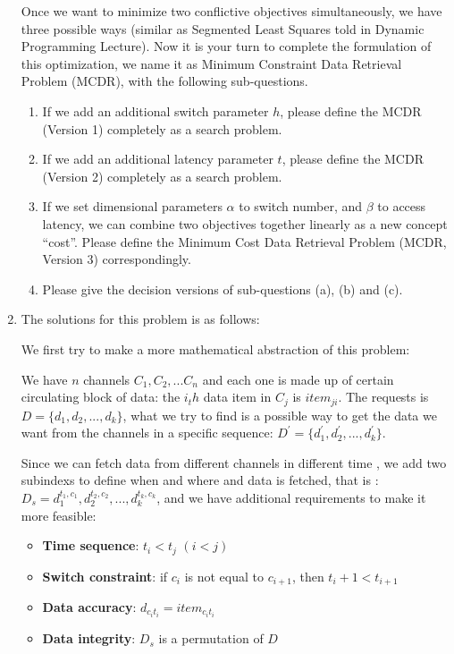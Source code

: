 \documentclass[12pt,a4paper]{article}
\makeatletter
\newtheorem*{solution}{Solution}
\theoremstyle{definition}
\renewenvironment{solution}[1][Solution] {\par\pushQED{\qed}\normalfont\topsep6\p@\@plus6\p@\relax\trivlist\item[\hskip\labelsep\bfseries#1\@addpunct{.}]\ignorespaces}{\popQED\endtrivlist\@endpefalse} \makeatother
\makeatother
\begin{document}
\begin{enumerate}
Once we want to minimize two conflictive objectives simultaneously, we have three possible ways (similar as Segmented Least Squares told in Dynamic Programming Lecture). Now it is your turn to complete the formulation of this optimization, we name it as Minimum Constraint Data Retrieval Problem (MCDR), with the following sub-questions.
\begin{enumerate}
	\item If we add an additional switch parameter $h$, please define the MCDR (Version 1) completely as a search problem.
	\item If we add an additional latency parameter $t$, please define the MCDR (Version 2) completely as a search problem.
	\item If we set dimensional parameters $\alpha$ to switch number, and $\beta$ to access latency, we can combine two objectives together linearly as a new concept ``cost''. Please define the Minimum Cost Data Retrieval Problem (MCDR, Version 3) correspondingly.
	\item Please give the decision versions of sub-questions (a), (b) and (c).
\end{enumerate}



\begin{solution}
	The solutions for this problem is as follows:

	We first try to make a more mathematical abstraction of this problem:

	We have $n$ channels $C_1, C_2, ... C_n$ and each one is made up of certain circulating  block of data:
	the $i_th$ data item in $C_j$ is $item_{ji}$. The requests is $D = \{d_1, d_2, ..., d_k\}$, what we try to find 
	is a possible way to get the data we want from the channels in a specific sequence: $D^{'} = \{ d_1^{'}, d_2^{'}, ..., d_k^{'} \}$.
	
	Since we can fetch data from different channels in different time , we add two subindexs to define  when and where and data is fetched, that is :
	$D_{s} = {d_1^{t_1, c_1}, d_2^{t_2, c_2}, ..., d_k^{t_k, c_k}}$, and we have additional requirements to make it more feasible:

	\begin{itemize}
		\item \textbf{Time sequence}: $t_i < t_j$ $(i < j)$
		\item \textbf{Switch constraint}: if $c_i$ is not equal to $c_{i + 1}$, then $t_i + 1 < t_{i + 1}$
		\item \textbf{Data accuracy}: $d_{c_i t_i} = item_{c_i t_i}$
		\item \textbf{Data integrity}: $D_{s}$ is a permutation of $D$
	\end{itemize}



\end{solution}
\end{enumerate}
\end{document}
